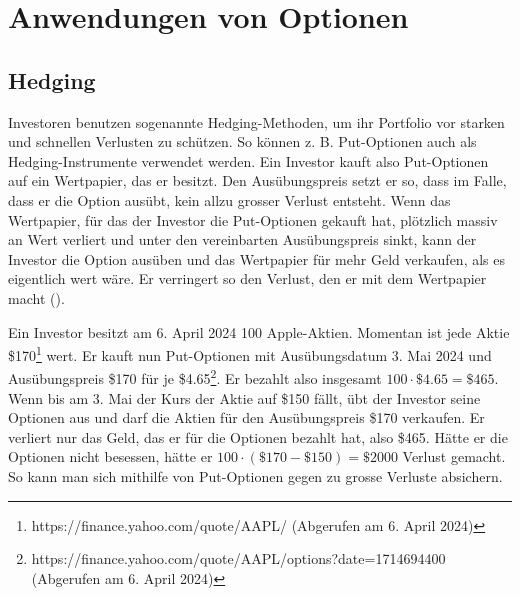 \documentclass[11pt]{report} %
\begin{document}
\section{Anwendungen von Optionen}
\subsection{Hedging}
Investoren benutzen sogenannte Hedging-Methoden, um ihr Portfolio vor starken und schnellen Verlusten zu schützen. So können z. B. Put-Optionen auch als Hedging-Instrumente verwendet werden. Ein Investor kauft also Put-Optionen auf ein Wertpapier, das er besitzt. Den Ausübungspreis setzt er so, dass im Falle, dass er die Option ausübt, kein allzu grosser Verlust entsteht. Wenn das Wertpapier, für das der Investor die Put-Optionen gekauft hat, plötzlich massiv an Wert verliert und unter den vereinbarten Ausübungspreis sinkt, kann der Investor die Option ausüben und das Wertpapier für mehr Geld verkaufen, als es eigentlich wert wäre. Er verringert so den Verlust, den er mit dem Wertpapier macht (\cite{Yates_2022}).
\begin{Beispiel}{}{}
    Ein Investor besitzt am 6. April 2024 100 Apple-Aktien. Momentan ist jede Aktie \$170\footnote{https://finance.yahoo.com/quote/AAPL/ (Abgerufen am 6. April 2024)} wert. Er kauft nun Put-Optionen mit Ausübungsdatum 3. Mai 2024 und Ausübungspreis \$170 für je \$4.65\footnote{https://finance.yahoo.com/quote/AAPL/options?date=1714694400 (Abgerufen am 6. April 2024)}. Er bezahlt also insgesamt $100\cdot\$4.65=\$465$. Wenn bis am 3. Mai der Kurs der Aktie auf \$150 fällt, übt der Investor seine Optionen aus und darf die Aktien für den Ausübungspreis \$170 verkaufen. Er verliert nur das Geld, das er für die Optionen bezahlt hat, also \$465. Hätte er die Optionen nicht besessen, hätte er $100\cdot(\$170-\$150)=\$2000$ Verlust gemacht. So kann man sich mithilfe von Put-Optionen gegen zu grosse Verluste absichern.
\end{Beispiel}
\end{document}
